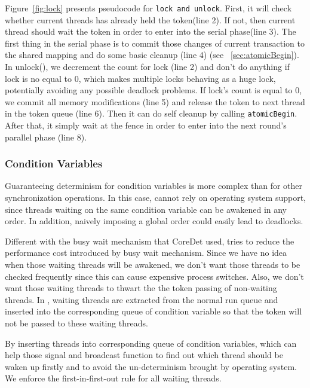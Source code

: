 \label{sec:lock}
Figure~\ref{fig:lock} presents pseudocode for \texttt{lock and unlock}.
First, it will check whether current threads has already held the token(line 2). 
If not, then current thread should wait the token in order to enter into 
the serial phase(line 3). The first thing in the serial phase is to
commit those changes of current transaction to the shared mapping and 
do some basic cleanup (line 4) (see ~\ref{sec:atomicBegin}).
In unlock(), we decrement the count for lock (line 2) and don't do anything if
lock is no equal to 0, which makes multiple locks behaving as a huge lock, potentially 
avoiding any possible deadlock problems.
If lock's count is equal to 0, we commit all memory modifications (line 5) and release
the token to next thread in the token queue (line 6). Then it can do self cleanup by calling
\texttt{atomicBegin}. After that, it simply wait at the fence in order to enter into the next
round's parallel phase (line 8).

\subsubsection{Condition Variables}

Guaranteeing determinism for condition variables is more complex than
for other synchronization operations. In this case, \dthreads{} cannot
rely on operating system support, since threads waiting on the same
condition variable can be awakened in any order. In addition, naively
imposing a global order could easily lead to deadlocks.

\label{sec:condwait}
Different with the busy wait mechanism that CoreDet used, 
\dthreads{} tries to reduce the performance cost
introduced by busy wait mechanism. Since we have no idea when those
waiting threads will be awakened, we don't want those threads to be
checked frequently since this can cause expensive process
switches. Also, we don't want those waiting threads to thwart the the
token passing of non-waiting threads.
In \dthreads{}, waiting threads are extracted from the normal run
queue and inserted into the corresponding queue of condition
variable so that the token will not be passed to these waiting
threads.

By inserting threads into corresponding queue of condition
variables, which can help those signal and broadcast function to find
out which thread should be waken up firstly and to avoid the
un-determinism brought by operating system. We enforce the
first-in-first-out rule for all waiting threads.

